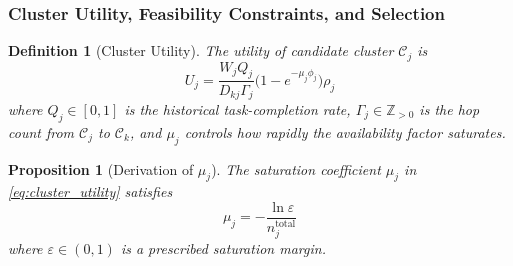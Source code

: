 \documentclass[journal]{IEEEtran}
\newtheorem{definition}{Definition}
\newtheorem{proposition}{Proposition}
\begin{document}
\subsubsection{Cluster Utility, Feasibility Constraints, and Selection}

\begin{definition}[Cluster Utility]
The utility of candidate cluster $\mathcal{C}_{j}$ is
\begin{equation}
  U_{j}=\frac{W_{j}Q_{j}}{D_{kj}\Gamma_{j}}
         \bigl(1-e^{-\mu_{j}\phi_{j}}\bigr)\rho_{j}
  \label{eq:cluster_utility}
\end{equation}
where $Q_{j}\in[0,1]$ is the historical task-completion rate,
$\Gamma_{j}\in\mathbb{Z}_{>0}$ is the hop count from $\mathcal{C}_{j}$ to
$\mathcal{C}_{k}$, and $\mu_{j}$ controls how rapidly the availability
factor saturates.
\end{definition}

\begin{proposition}[Derivation of $\mu_{j}$]
\label{prop:mu}
The saturation coefficient $\mu_{j}$ in \eqref{eq:cluster_utility}
satisfies
\begin{equation}
  \mu_{j}=-\frac{\ln\varepsilon}{n_{j}^{\mathrm{total}}}
  \label{eq:mu}
\end{equation}
where $\varepsilon\in(0,1)$ is a prescribed saturation margin.
\end{proposition}
\end{document}
